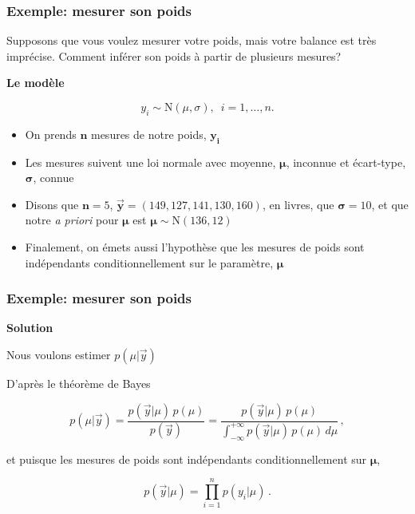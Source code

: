 \documentclass{beamer}
\begin{document}
\begin{frame}
    \frametitle{Exemple: mesurer son poids}
    Supposons que vous voulez mesurer votre poids, mais votre balance
    est très imprécise. Comment inférer son poids à partir de plusieurs mesures?

    \pause

    \vfill

    \textbf{Le modèle}

    \[y_i \sim \textrm{N}(\mu, \sigma), \, \, \, i = 1, \ldots, n.\]

    \pause

    \begin{itemize}
      \item On prends $\boldsymbol{n}$ mesures de notre poids, $\boldsymbol{y_i}$
      \pause
      \item Les mesures suivent une loi normale avec moyenne, $\boldsymbol{\mu}$,
            inconnue et écart-type, $\boldsymbol{\sigma}$, connue
      \pause
      \item Disons que $\boldsymbol{n} = 5$, $\boldsymbol{\vec{y}} = (149, 127, 141, 130, 160)$, en livres,
            que $\boldsymbol{\sigma} = 10$, et que notre \emph{a priori} pour $\boldsymbol{\mu}$
            est $\boldsymbol{\mu} \sim \textrm{N}(136, 12)$
      \pause
      \item Finalement, on émets aussi l'hypothèse que les mesures de poids sont indépendants
            conditionnellement sur le paramètre, $\boldsymbol{\mu}$
    \end{itemize}
\end{frame}


\begin{frame}
    \frametitle{Exemple: mesurer son poids}
    \textbf{Solution}

    \vfill

    Nous voulons estimer $p(\mu | \vec{y})$

    \pause

    \vfill

    D'après le théorème de Bayes

    \[p(\mu | \vec{y}) = \frac{p(\vec{y} | \mu) \, p(\mu)}{p(\vec{y})} 
      = \frac{p(\vec{y} | \mu) \, p(\mu)}{\int_{-\infty}^{+\infty} p(\vec{y} | \mu) \, p(\mu) \, d\mu} \, ,\]

    \pause

    et puisque les mesures de poids sont indépendants conditionnellement sur $\boldsymbol{\mu}$,

    \[p(\vec{y} | \mu) = \prod_{i=1}^{n} p(y_i | \mu) \, .\]
\end{frame}
\end{document}
